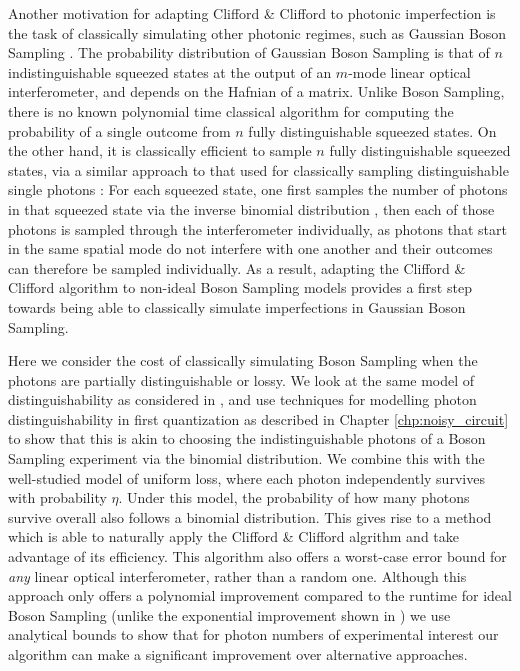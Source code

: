 Another motivation for adapting Clifford \& Clifford to photonic imperfection is the task of classically simulating other photonic regimes, such as Gaussian Boson Sampling \cite{hamilton2017}. The probability distribution of Gaussian Boson Sampling is that of $n$ indistinguishable squeezed states at the output of an $m$-mode linear optical interferometer, and depends on the Hafnian of a matrix. Unlike Boson Sampling, there is no known polynomial time classical algorithm for computing the probability of a single outcome from $n$ fully distinguishable squeezed states. On the other hand, it is classically efficient to sample $n$ fully distinguishable squeezed states, via a similar approach to that used for classically sampling distinguishable single photons \cite{aaronson2014}: For each squeezed state, one first samples the number of photons in that squeezed state via the inverse binomial distribution \cite{wu2019}, then each of those photons is sampled through the interferometer individually, as photons that start in the same spatial mode do not interfere with one another and their outcomes can therefore be sampled individually. As a result, adapting the Clifford \& Clifford algorithm to non-ideal Boson Sampling models provides a first step towards being able to classically simulate imperfections in Gaussian Boson Sampling.

Here we consider the cost of classically simulating Boson Sampling when the photons are partially distinguishable or lossy.
We look at the same model of distinguishability as considered in \cite{renema2018,renema2018loss}, and use techniques for modelling photon distinguishability in first quantization as described in Chapter \ref{chp:noisy_circuit} to show that this is akin to choosing the indistinguishable photons of a Boson Sampling experiment via the binomial distribution. 
We combine this with the well-studied model of uniform loss, where each photon independently survives with probability $\eta$. Under this model, the probability of how many photons survive overall also follows a binomial distribution. 
This gives rise to a method which is able to naturally apply the Clifford \& Clifford algrithm and take advantage of its efficiency. This algorithm also offers a worst-case error bound for \textit{any} linear optical interferometer, rather than a random one.
Although this approach only offers a polynomial improvement compared to the runtime for ideal Boson Sampling (unlike the exponential improvement shown in \cite{renema2018,renema2018loss}) we use analytical bounds to show that for photon numbers of experimental interest our algorithm can make a significant improvement over alternative approaches.

